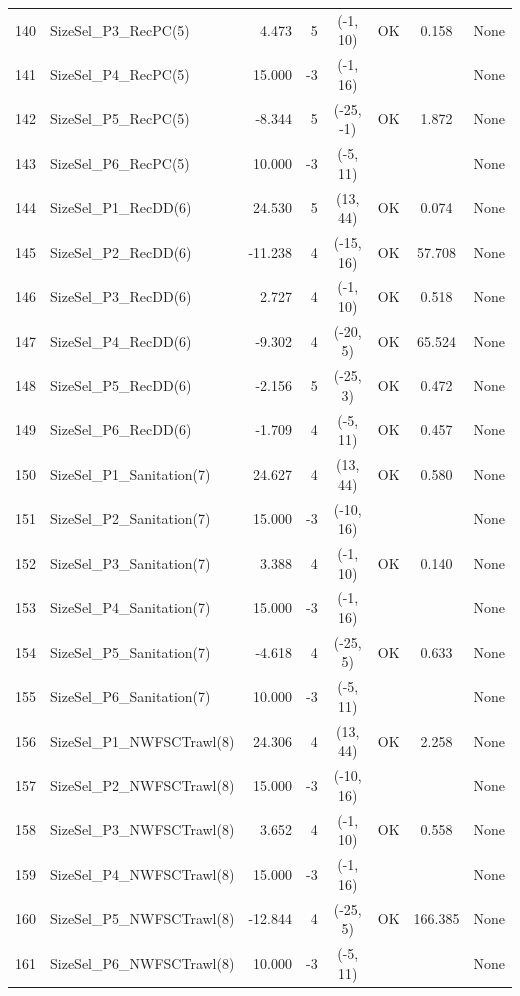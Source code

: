 \documentclass[12pt,]{article}
\begin{document}
\begin{landscape}
\begin{longtable}{rlrrcccl}
  140 & SizeSel\_P3\_RecPC(5) & 4.473 & 5 & (-1, 10) & OK & 0.158 & None \\ 
  141 & SizeSel\_P4\_RecPC(5) & 15.000 & -3 & (-1, 16) &  &  & None \\ 
  142 & SizeSel\_P5\_RecPC(5) & -8.344 & 5 & (-25, -1) & OK & 1.872 & None \\ 
  143 & SizeSel\_P6\_RecPC(5) & 10.000 & -3 & (-5, 11) &  &  & None \\ 
  144 & SizeSel\_P1\_RecDD(6) & 24.530 & 5 & (13, 44) & OK & 0.074 & None \\ 
  145 & SizeSel\_P2\_RecDD(6) & -11.238 & 4 & (-15, 16) & OK & 57.708 & None \\ 
  146 & SizeSel\_P3\_RecDD(6) & 2.727 & 4 & (-1, 10) & OK & 0.518 & None \\ 
  147 & SizeSel\_P4\_RecDD(6) & -9.302 & 4 & (-20, 5) & OK & 65.524 & None \\ 
  148 & SizeSel\_P5\_RecDD(6) & -2.156 & 5 & (-25, 3) & OK & 0.472 & None \\ 
  149 & SizeSel\_P6\_RecDD(6) & -1.709 & 4 & (-5, 11) & OK & 0.457 & None \\ 
  150 & SizeSel\_P1\_Sanitation(7) & 24.627 & 4 & (13, 44) & OK & 0.580 & None \\ 
  151 & SizeSel\_P2\_Sanitation(7) & 15.000 & -3 & (-10, 16) &  &  & None \\ 
  152 & SizeSel\_P3\_Sanitation(7) & 3.388 & 4 & (-1, 10) & OK & 0.140 & None \\ 
  153 & SizeSel\_P4\_Sanitation(7) & 15.000 & -3 & (-1, 16) &  &  & None \\ 
  154 & SizeSel\_P5\_Sanitation(7) & -4.618 & 4 & (-25, 5) & OK & 0.633 & None \\ 
  155 & SizeSel\_P6\_Sanitation(7) & 10.000 & -3 & (-5, 11) &  &  & None \\ 
  156 & SizeSel\_P1\_NWFSCTrawl(8) & 24.306 & 4 & (13, 44) & OK & 2.258 & None \\ 
  157 & SizeSel\_P2\_NWFSCTrawl(8) & 15.000 & -3 & (-10, 16) &  &  & None \\ 
  158 & SizeSel\_P3\_NWFSCTrawl(8) & 3.652 & 4 & (-1, 10) & OK & 0.558 & None \\ 
  159 & SizeSel\_P4\_NWFSCTrawl(8) & 15.000 & -3 & (-1, 16) &  &  & None \\ 
  160 & SizeSel\_P5\_NWFSCTrawl(8) & -12.844 & 4 & (-25, 5) & OK & 166.385 & None \\ 
  161 & SizeSel\_P6\_NWFSCTrawl(8) & 10.000 & -3 & (-5, 11) &  &  & None \\ 

\end{longtable}
\end{landscape}
\end{document}
